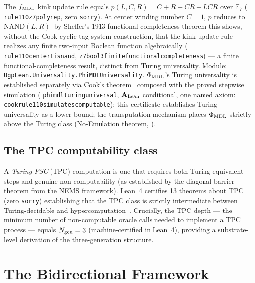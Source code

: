 \documentclass[11pt]{article}
\theoremstyle{remark}
\newcommand{\Ngen}{N_{\rm gen}}
\newcommand{\fmdl}{f_{\rm MDL}}
\newcommand{\lean}[1]{%
  \penalty-100
  \begingroup\def\_{\textunderscore\allowbreak}\texttt{#1}\endgroup}
\newcommand{\CatAL}{\ensuremath{\textbf{A}_{\rm Lean}}}
\begin{document}
\begin{tcolorbox}[colback=blue!3,colframe=blue!40!black,
  title={\textbf{Algebraic characterization of the substrate}},
  fonttitle=\bfseries,left=6pt,right=6pt,top=4pt,bottom=4pt]
\small
The $\fmdl$ kink update rule equals $p(L,C,R)=C+R-CR-LCR$ over $\mathbb{F}_7$
(\lean{rule110\_z7\_poly\_rep}, zero \texttt{sorry}). At center winding number $C=1$,
$p$ reduces to $\mathrm{NAND}(L,R)$; by Sheffer's 1913 functional-completeness theorem
this shows, without the Cook cyclic tag system construction, that the kink update rule
realizes any finite two-input Boolean function algebraically
(\lean{rule110\_center1\_is\_nand}, \lean{z7\_bool3\_finite\_functional\_completeness}) ---
a finite functional-completeness result, distinct from Turing universality.
Module: \lean{UgpLean.Universality.PhiMDLUniversality}.
$\Phi_{\rm MDL}$'s Turing universality is established separately via Cook's
theorem~\cite{Cook2004} composed with the proved stepwise simulation
(\lean{phimdl\_turing\_universal}, $\CatAL$ conditional, one named axiom:
\lean{cook\_rule110\_simulates\_computable}); this certificate establishes Turing
universality as a lower bound; the transputation mechanism places $\Phi_{\rm MDL}$
strictly above the Turing class (No-Emulation theorem, \cite{SpivackNEMS76}).
\end{tcolorbox}

\subsection{The TPC computability class}
\label{sec:tpc_class}

A \emph{Turing-PSC} (TPC) computation is one that requires both Turing-equivalent steps
and genuine non-computability (as established by the diagonal barrier theorem
from the NEMS framework). Lean~4 certifies 13 theorems about TPC (zero \texttt{sorry})
establishing that the TPC class is strictly intermediate between Turing-decidable and
hypercomputation~\cite{SpivackGTEMobius}.
Crucially, the TPC depth --- the minimum number of non-computable oracle calls needed
to implement a TPC process --- equals $\Ngen = 3$ (machine-certified in Lean~4),
providing a substrate-level derivation of the three-generation structure.

\section{The Bidirectional Framework}
\label{sec:framework}
\end{document}
